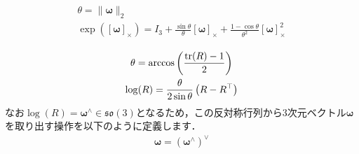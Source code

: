 \begin{align}
  \begin{gathered}
    \theta = \| \boldsymbol \omega \|_{2} \\
    \exp( [ \boldsymbol \omega ]_{\times} ) =
      I_{3} +
      \frac{ \sin \theta }{ \theta } [ \boldsymbol \omega ]_{\times} +
      \frac{ 1 - \cos \theta }{ \theta^{2} } [ \boldsymbol \omega ]_{\times}^{2}
  \end{gathered}
  \label{eq:so3_exp_map}
\end{align}
%

\begin{align}
  \begin{gathered}
    \theta = \arccos \left( \frac{{\rm tr}(R) - 1}{ 2 } \right) \\
    \log( R ) = \frac{ \theta }{ 2 \sin \theta } \left( R - R^{\top} \right)
  \end{gathered}
\end{align}
%
なお$\log( R ) = \boldsymbol \omega^{\wedge} \in \mathfrak{so}(3)$となるため，この反対称行列から3次元ベクトル$\boldsymbol \omega$を取り出す操作を以下のように定義します．
%
\begin{align}
  \boldsymbol \omega = \left( \boldsymbol \omega^{\wedge} \right)^{\vee}
\end{align}


